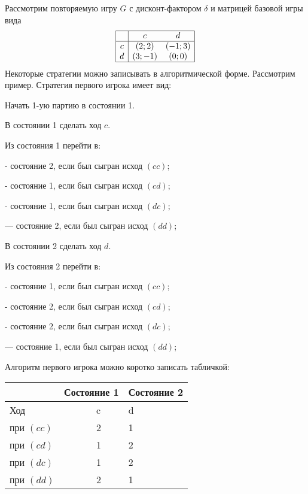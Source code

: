 \begin{problem}

Рассмотрим повторяемую игру  $G$  с дисконт-фактором  $\delta $  и матрицей базовой игры вида
\[\begin{array}{|c|cc|}  \hline {} & {c} & {d} \\  \hline {c} & {(2;2)} & {(-1;3)} \\ {d} & {(3;-1)} & {(0;0)} \\  \hline  \end{array}\]
Некоторые стратегии можно записывать в алгоритмической форме. Рассмотрим пример.
Стратегия первого игрока имеет вид:\par
Начать 1-ую партию в состоянии 1.\par
В состоянии 1 сделать ход  $c$.\par
Из состояния 1 перейти в:\par
- состояние 2, если был сыгран исход  $\left(cc\right)$;\par
- состояние 1, если был сыгран исход  $\left(cd\right)$;\par
- состояние 1, если был сыгран исход  $\left(dc\right)$;\par
       --- состояние 2, если был сыгран исход  $\left(dd\right)$;\par
В состоянии 2 сделать ход  $d$.\par
Из состояния 2 перейти в:\par
- состояние 1, если был сыгран исход  $\left(cc\right)$;\par
- состояние 2, если был сыгран исход  $\left(cd\right)$;\par
- состояние 2, если был сыгран исход  $\left(dc\right)$;\par
       --- состояние 1, если был сыгран исход  $\left(dd\right)$;\par
Алгоритм первого игрока можно коротко записать табличкой:


\begin{tabular} {|p{43.12pt}| p{19.60pt}| p{37.52pt}| p{19.60pt}| p{31.92pt}| } \hline
   &  \multicolumn{2}{|l|}{ Состояние 1 } &  \multicolumn{2}{|l|}{ Состояние 2 } \\ \hline
 \multicolumn{2}{|l|}{ Ход } &  \multicolumn{2}{|l|}{ c } &  d  \\ \hline
 \multicolumn{2}{|l|}{ при  $\left(cc\right)$  } &  \multicolumn{2}{|l|}{ 2 } &  1  \\ \hline
 \multicolumn{2}{|l|}{ при  $\left(cd\right)$  } &  \multicolumn{2}{|l|}{ 1 } &  2  \\ \hline
 \multicolumn{2}{|l|}{ при  $\left(dc\right)$  } &  \multicolumn{2}{|l|}{ 1 } &  2  \\ \hline
 \multicolumn{2}{|l|}{ при  $\left(dd\right)$  } &  \multicolumn{2}{|l|}{ 2 } &  1  \\ \hline
\end{tabular}


\end{problem}
